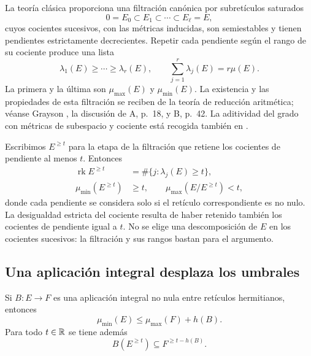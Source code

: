 La teoría clásica proporciona una filtración canónica por subretículos
saturados
\[
 0=E_0\subset E_1\subset\cdots\subset E_\ell=E,
\]
cuyos cocientes sucesivos, con las métricas inducidas, son semiestables
y tienen pendientes estrictamente decrecientes. Repetir cada pendiente
según el rango de su cociente produce una lista
\begin{equation}
 \lambda_1(E)\ge\cdots\ge\lambda_r(E),\qquad
 \sum_{j=1}^r\lambda_j(E)=r\mu(E).
 \label{eq:marcos-lista-hn}
\end{equation}
La primera y la última son $\mu_{\max}(E)$ y $\mu_{\min}(E)$.
La existencia y las propiedades de esta filtración se reciben de la
teoría de reducción aritmética; véanse Grayson \cite{grayson-hn},
la discusión de A, p.~18, y B, p.~42. La aditividad del grado con
métricas de subespacio y cociente está recogida también en
\cite[§4.1.1, Lema~4.2]{bost-pendientes}.

Escribimos $E^{\ge t}$ para la etapa de la filtración que retiene
los cocientes de pendiente al menos $t$. Entonces
\begin{align}
 \operatorname{rk}E^{\ge t}&=\#\{j:\lambda_j(E)\ge t\},
                  \label{eq:marcos-corte-hn}\\
 \mu_{\min}(E^{\ge t})&\ge t,\qquad
 \mu_{\max}(E/E^{\ge t})<t,
                  \label{eq:marcos-extremos-hn}
\end{align}
donde cada pendiente se considera solo si el retículo correspondiente
es no nulo. La desigualdad estricta del cociente resulta de haber
retenido también los cocientes de pendiente igual a $t$.
No se elige una descomposición de $E$ en los cocientes sucesivos:
la filtración y sus rangos bastan para el argumento.

\subsection{Una aplicación integral desplaza los umbrales}

\begin{lema}
Si $B:E\to F$ es una aplicación integral no nula entre retículos
hermitianos, entonces
\begin{equation}
 \mu_{\min}(E)\le\mu_{\max}(F)+h(B).
 \label{eq:marcos-morfismo-pendientes}
\end{equation}
Para todo $t\in\mathbb{R}$ se tiene además
\begin{equation}
 B(E^{\ge t})\subseteq F^{\ge t-h(B)}.
 \label{eq:marcos-inclusion-filtrada}
\end{equation}
\label{lem:marcos-altura}
\end{lema}

